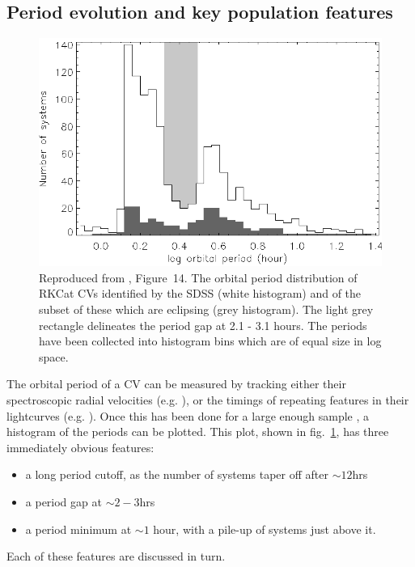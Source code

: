 \subsection{Period evolution and key population features}
\label{sect:introduction:period distribution key features}
\begin{figure}
    \centering
    \includegraphics[width=\columnwidth]{figures/introduction/pd-rk.eps}
    \caption{Reproduced from \citet{southworth2015}, Figure~14. The orbital period distribution of RKCat \citep{RKCat} CVs identified by the SDSS (white histogram) and of the subset of these which are eclipsing (grey histogram). The light grey rectangle delineates the period gap at 2.1 - 3.1 hours. The periods have been collected into histogram bins which are of equal size in log space.}
    \label{fig:period hist}
\end{figure}

The orbital period of a CV can be measured by tracking either their spectroscopic radial velocities (e.g. \citealt{gaensicke2009}), or the timings of repeating features in their lightcurves (e.g. \citealt{Littlefair2008}). Once this has been done for a large enough sample \citep{southworth2015}, a histogram of the periods can be plotted. This plot, shown in fig.~\ref{fig:period hist}, has three immediately obvious features:
\begin{itemize}
    \item a long period cutoff, as the number of systems taper off after $\sim12$hrs
    \item a period gap at $\sim2-3$hrs
    \item a period minimum at $\sim1$ hour, with a pile-up of systems just above it.
\end{itemize}
Each of these features are discussed in turn.


